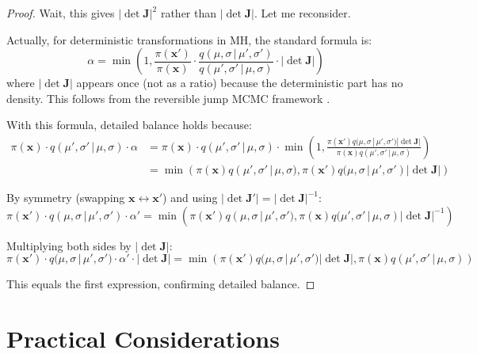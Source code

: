 \documentclass[11pt,a4paper]{article}
\theoremstyle{definition}
\newcommand{\given}{\,|\,}
\begin{document}
\begin{proof}
Wait, this gives $|\det \bm{J}|^2$ rather than $|\det \bm{J}|$. Let me reconsider.

Actually, for deterministic transformations in MH, the standard formula is:
\begin{equation}
    \alpha = \min\left(1, \frac{\pi(\bm{x}')}{\pi(\bm{x})} \cdot
    \frac{q(\mu, \sigma \given \mu', \sigma')}{q(\mu', \sigma' \given \mu, \sigma)} \cdot |\det \bm{J}|\right)
\end{equation}
where $|\det \bm{J}|$ appears once (not as a ratio) because the deterministic part has
no density. This follows from the reversible jump MCMC framework \cite{Green1995}.

With this formula, detailed balance holds because:
\begin{align}
    \pi(\bm{x}) \cdot q(\mu', \sigma' \given \mu, \sigma) \cdot \alpha &=
    \pi(\bm{x}) \cdot q(\mu', \sigma' \given \mu, \sigma) \cdot
    \min\left(1, \frac{\pi(\bm{x}') q(\mu, \sigma \given \mu', \sigma') |\det \bm{J}|}
    {\pi(\bm{x}) q(\mu', \sigma' \given \mu, \sigma)}\right) \\
    &= \min\left(\pi(\bm{x}) q(\mu', \sigma' \given \mu, \sigma),
    \pi(\bm{x}') q(\mu, \sigma \given \mu', \sigma') |\det \bm{J}|\right)
\end{align}

By symmetry (swapping $\bm{x} \leftrightarrow \bm{x}'$) and using $|\det \bm{J}'| = |\det \bm{J}|^{-1}$:
\begin{equation}
    \pi(\bm{x}') \cdot q(\mu, \sigma \given \mu', \sigma') \cdot \alpha' =
    \min\left(\pi(\bm{x}') q(\mu, \sigma \given \mu', \sigma'),
    \pi(\bm{x}) q(\mu', \sigma' \given \mu, \sigma) |\det \bm{J}|^{-1}\right)
\end{equation}

Multiplying both sides by $|\det \bm{J}|$:
\begin{equation}
    \pi(\bm{x}') \cdot q(\mu, \sigma \given \mu', \sigma') \cdot \alpha' \cdot |\det \bm{J}| =
    \min\left(\pi(\bm{x}') q(\mu, \sigma \given \mu', \sigma') |\det \bm{J}|,
    \pi(\bm{x}) q(\mu', \sigma' \given \mu, \sigma)\right)
\end{equation}

This equals the first expression, confirming detailed balance.
\end{proof}

\section{Practical Considerations}
\label{sec:practical}
\end{document}
